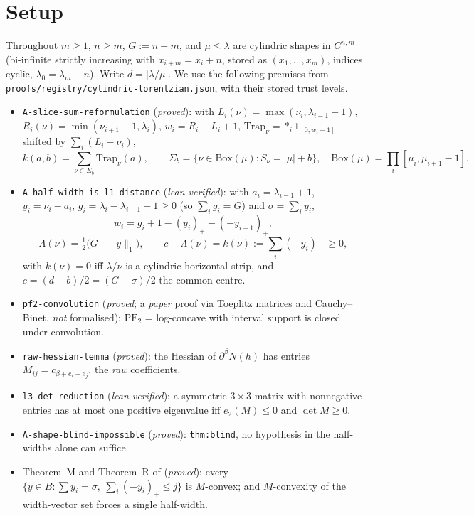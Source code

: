 \documentclass[11pt]{article}
\theoremstyle{plain}
\theoremstyle{definition}
\newcommand{\PFtwo}{\mathrm{PF}_2}
\newcommand{\Trap}{\mathrm{Trap}}
\newcommand{\pp}[1]{\left(#1\right)_{+}}
\begin{document}
\section{Setup}\label{sec:setup}

Throughout $m\ge1$, $n\ge m$, $G:=n-m$, and $\mu\le\lambda$ are cylindric shapes in
$C^{n,m}$ (bi-infinite strictly increasing with $x_{i+m}=x_i+n$, stored as
$(x_1,\dots,x_m)$, indices cyclic, $\lambda_0=\lambda_m-n$). Write $d=|\lambda/\mu|$.
We use the following premises from
\texttt{proofs/registry/cylindric-lorentzian.json}, with their stored trust levels.

\begin{itemize}
\item \texttt{A-slice-sum-reformulation} (\emph{proved}): with
  $L_i(\nu)=\max(\nu_i,\lambda_{i-1}+1)$, $R_i(\nu)=\min(\nu_{i+1}-1,\lambda_i)$,
  $w_i=R_i-L_i+1$, $\Trap_\nu=\ast_i\mathbf1_{[0,w_i-1]}$ shifted by $\sum_i(L_i-\nu_i)$,
  \[
    k(a,b)=\sum_{\nu\in\Sigma_b}\Trap_\nu(a),\qquad
    \Sigma_b=\{\nu\in\mathrm{Box}(\mu):S_\nu=|\mu|+b\},\quad
    \mathrm{Box}(\mu)=\textstyle\prod_i[\mu_i,\mu_{i+1}-1].
  \]
\item \texttt{A-half-width-is-l1-distance} (\emph{lean-verified}): with
  $a_i=\lambda_{i-1}+1$, $y_i=\nu_i-a_i$, $g_i=\lambda_i-\lambda_{i-1}-1\ge0$
  (so $\sum_ig_i=G$) and $\sigma=\sum_iy_i$,
  \begin{equation}\label{eq:w}
     w_i=g_i+1-\pp{y_i}-\pp{-y_{i+1}},
  \end{equation}
  \begin{equation}\label{eq:Lam}
     \Lambda(\nu)=\tfrac12\bigl(G-\|y\|_1\bigr),\qquad
     c-\Lambda(\nu)=k(\nu):=\sum_i\pp{-y_i}\ \ge 0 ,
  \end{equation}
  with $k(\nu)=0$ iff $\lambda/\nu$ is a cylindric horizontal strip, and
  $c=(d-b)/2=(G-\sigma)/2$ the common centre.
\item \texttt{pf2-convolution} (\emph{proved}; a \emph{paper} proof via Toeplitz
  matrices and Cauchy--Binet, \emph{not} formalised): $\PFtwo$ = log-concave with
  interval support is closed under convolution.
\item \texttt{raw-hessian-lemma} (\emph{proved}): the Hessian of $\partial^\beta N(h)$
  has entries $M_{ij}=c_{\beta+e_i+e_j}$, the \emph{raw} coefficients.
\item \texttt{l3-det-reduction} (\emph{lean-verified}): a symmetric $3\times3$ matrix
  with nonnegative entries has at most one positive eigenvalue iff $e_2(M)\le0$ and
  $\det M\ge0$.
\item \texttt{A-shape-blind-impossible} (\emph{proved}): \texttt{thm:blind}, no
  hypothesis in the half-widths alone can suffice.
\item Theorem~M and Theorem~R of \cite{c1004} (\emph{proved}): every
  $\{y\in B:\sum y_i=\sigma,\ \sum_i\pp{-y_i}\le j\}$ is $M$-convex; and $M$-convexity of
  the width-vector set forces a single half-width.
\end{itemize}
\end{document}
